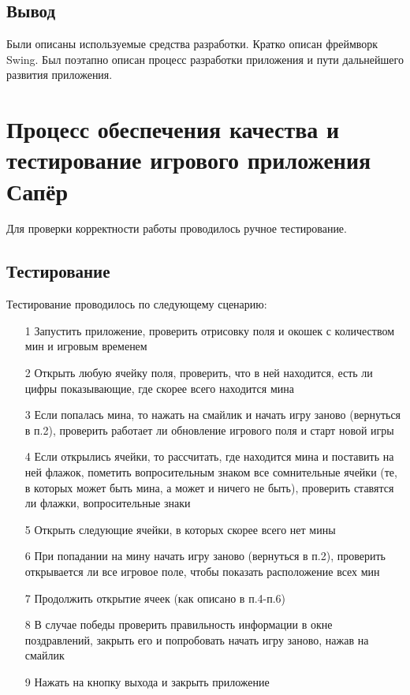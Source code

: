 \subsection{Вывод}

Были описаны используемые средства разработки. Кратко описан фреймворк Swing. Был поэтапно описан процесс разработки приложения и пути дальнейшего развития приложения.

\section{Процесс обеспечения качества и тестирование игрового приложения Сапёр}

Для проверки корректности работы проводилось ручное тестирование.

\subsection{Тестирование}

Тестирование проводилось по следующему сценарию:
\begin{enumerate}
\item[1]  Запустить приложение, проверить отрисовку поля и окошек с количеством мин и игровым временем
\item[2]  Открыть любую ячейку поля, проверить, что в ней находится, есть ли цифры показывающие, где скорее всего находится мина
\item[3]  Если попалась мина, то нажать на смайлик и начать игру заново (вернуться в п.2), проверить работает ли обновление игрового поля и старт новой игры
\item[4]  Если открылись ячейки, то рассчитать, где находится мина и поставить на ней флажок, пометить вопросительным знаком все сомнительные ячейки (те, в которых может быть мина, а может и ничего не быть), проверить ставятся ли флажки, вопросительные знаки
\item[5]  Открыть следующие ячейки, в которых скорее всего нет мины
\item[6]  При попадании на мину начать игру заново (вернуться в п.2), проверить открывается ли все игровое поле, чтобы показать расположение всех мин
\item[7]  Продолжить открытие ячеек (как описано в п.4-п.6)
\item[8]  В случае победы проверить правильность информации в окне поздравлений, закрыть его и попробовать начать игру заново, нажав на смайлик
\item[9]  Нажать на кнопку выхода и закрыть приложение
\end{enumerate}

